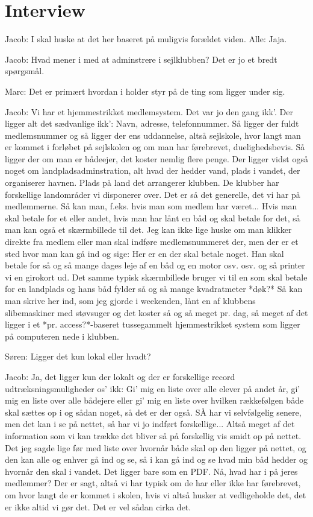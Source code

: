 \section{Interview}
Jacob: I skal huske at det her baseret på muligvis forældet viden.
Alle: Jaja.

Jacob: Hvad mener i med at adminstrere i sejlklubben? Det er jo et bredt spørgsmål.

Marc: Det er primært hvordan i holder styr på de ting som ligger under sig.

Jacob: Vi har et hjemmestrikket medlemsystem. Det var jo den gang ikk'. Der ligger alt det sædvanlige ikk': Navn, adresse, telefonnummer. Så ligger der fuldt medlemsnummer og så ligger der ens uddannelse, altså sejlskole, hvor langt man er kommet i forløbet på sejlskolen og om man har førebrevet, duelighedsbevis. Så ligger der om man er bådeejer, det koster nemlig flere penge. Der ligger vidst også noget om landpladsadminstration, alt hvad der hedder vand, plads i vandet, der organiserer havnen. Plads på land det arrangerer klubben. De klubber har forskellige landområder vi disponerer over. Det er så det generelle, det vi har på medlemmerne.
Så kan man, f.eks. hvis man som medlem har været... Hvis man skal betale for et eller andet, hvis man har lånt en båd og skal betale for det, så man kan også et skærmbillede til det. Jeg kan ikke lige huske om man klikker direkte fra medlem eller man skal indføre medlemsnummeret der, men der er et sted hvor man kan gå ind og sige: Her er en der skal betale noget. Han skal betale for så og så mange dages leje af en båd og en motor osv. osv. og så printer vi en girokort ud. Det samme typisk skærmbillede bruger vi til en som skal betale for en landplads og hans båd fylder så og så mange kvadratmeter *døk?* Så kan man skrive her ind, som jeg gjorde i weekenden, lånt en af klubbens slibemaskiner med støvsuger og det koster så og så meget pr. dag, så meget af det ligger i et *pr. access?*-baseret tussegammelt hjemmestrikket system som ligger på computeren nede i klubben.

Søren: Ligger det kun lokal eller hvadt?

Jacob: Ja, det ligger kun der lokalt og der er forskellige record udtræksningsmuligheder os' ikk: Gi' mig en liste over alle elever på andet år, gi' mig en liste over alle bådejere eller gi' mig en liste over hvilken rækkefølgen både skal sættes op i og sådan noget, så det er der også. SÅ har vi selvfølgelig senere, men det kan i se på nettet, så har vi jo indført forskellige... Altså meget af det information som vi kan trække det bliver så på forskellig vis smidt op på nettet. Det jeg sagde lige før med liste over hvornår både skal op den ligger på nettet, og den kan alle og enhver gå ind og se, så i kan gå ind og se hvad min båd hedder og hvornår den skal i vandet. Det ligger bare som en PDF. 
Nå, hvad har i på jeres medlemmer? Der er sagt, altså vi har typisk om de har eller ikke har førebrevet, om hvor langt de er kommet i skolen, hvis vi altså husker at vedligeholde det, det er ikke altid vi gør det. Det er vel sådan cirka det. 

